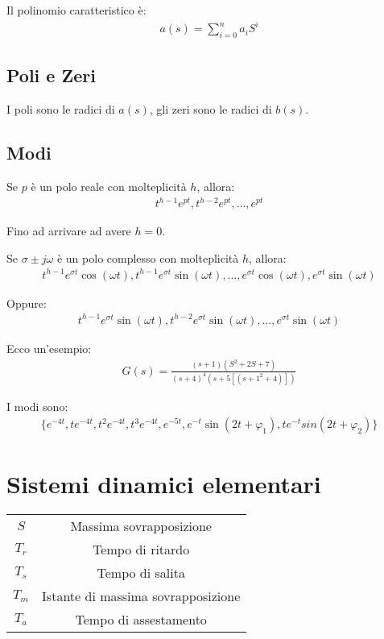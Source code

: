 \documentclass{article}
\begin{document}
Il polinomio caratteristico è:
\begin{align}
  a(s) = \sum_{i=0}^n a_i S^i
\end{align}


\subsection{Poli e Zeri}
I poli sono le radici di $a(s)$, gli zeri sono le radici di $b(s)$.


\subsection{Modi}
Se $p$ \`e un polo reale con molteplicit\`a $h$, allora:
\begin{align}
  t^{h-1} e^{pt}, t^{h-2} e^{pt}, \dots, e^{pt}
\end{align}

Fino ad arrivare ad avere $h = 0$.

Se $\sigma \pm j \omega$ \`e un polo complesso con molteplicit\`a $h$, allora:
\begin{align}
  t^{h-1} e^{\sigma t} \cos(\omega t), t^{h-1} e^{\sigma t} \sin(\omega t), \dots, e^{\sigma t} \cos(\omega t), e^{\sigma t} \sin(\omega t)
\end{align}

Oppure:
\begin{align}
  t^{h-1} e^{\sigma t} \sin(\omega t), t^{h-2} e^{\sigma t} \sin(\omega t), \dots, e^{\sigma t} \sin(\omega t)
\end{align}



Ecco un'esempio:
\begin{align}
  G(s) = \frac{(s+1)(S^2 + 2S + 7)}{(s+4)^4(s+5[(s+1^2 +4)])}
\end{align}


I modi sono:
\begin{align}
  \Big\{
    e^{-4t}, te^{-4t}, t^2e^{-4t}, t^3e^{-4t}, 
    e^{-5t},
    e^{-t} \sin(2t + \varphi_1) , t e^{-t} sin(2t + \varphi_2)
    \Big\}
\end{align}

\section{Sistemi dinamici elementari}

\begin{center}
  \begin{tabular}{| c | c |}
    \hline
    $S$ & Massima sovrapposizione \\
    $T_r$ & Tempo di ritardo \\
    $T_s$ & Tempo di salita \\
    $T_m$ & Istante di massima sovrapposizione \\
    $T_a$ & Tempo di assestamento \\
    \hline
  \end{tabular}
\end{center}
\end{document}
